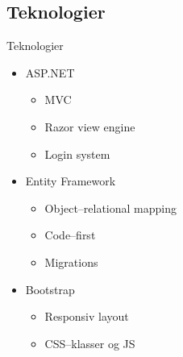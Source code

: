 		\subsection{Teknologier}
			\begin{frame}[t]{Teknologier} %
				\begin{itemize}
					\item ASP.NET
					\begin{itemize}
						\item MVC
						\item Razor view engine
						\item Login system
					\end{itemize}
					\item Entity Framework
					\begin{itemize}
						\item Object--relational mapping
						\item Code--first
						\item Migrations
					\end{itemize}
					\item Bootstrap
					\begin{itemize}
						\item Responsiv layout
						\item CSS--klasser og JS
					\end{itemize}
				\end{itemize}
			\end{frame}

